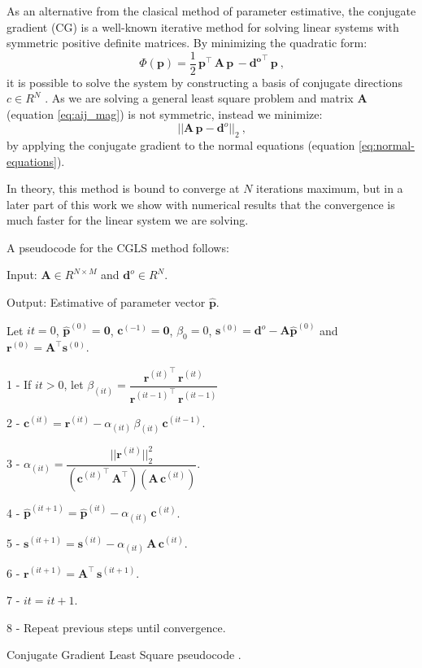 As an alternative from the clasical method of parameter estimative, the conjugate gradient (CG) is a well-known iterative method for solving linear systems with symmetric positive definite matrices. By minimizing the quadratic form:
\begin{equation}
\, \Phi(\mathbf{p}) = \frac{1}{2} \, \mathbf{p}^{\top} \, \mathbf{A} \, \mathbf{p} \,
- \mathbf{{d}^{o}}^{\top} \, \mathbf{p}\: ,
\label{eq:estimated-p-cg}
\end{equation}
it is possible to solve the system by constructing a basis of conjugate directions $c \in R^N$ \citep{aster2018parameter}. As we are solving a general least square problem and matrix $\mathbf{A}$ (equation \ref{eq:aij_mag}) is not symmetric, instead we minimize:
\begin{equation}
\, || \mathbf{A} \, \mathbf{p} - \mathbf{d}^o||_2 \: ,
\label{eq:estimated-p-cgls}
\end{equation}
by applying the conjugate gradient to the normal equations (equation \ref{eq:normal-equations}).

In theory, this method is bound to converge at $N$ iterations maximum, but in a later part of this work we show with numerical results that the convergence is much faster for the linear system we are solving.

A pseudocode for the CGLS method follows:

\begin{algorithm}[H]
	Input: $\mathbf{A} \in R^{N \times M} $ and $\mathbf{d}^o \in R^N$.
	
	Output: Estimative of parameter vector $\hat{\mathbf{p}}$.
	
	Let $it = 0$, $\hat{\mathbf{p}}^{(0)} = {\mathbf{0}}$, $\mathbf{c}^{(-1)} = {\mathbf{0}}$, $\beta_0 = 0$, $\mathbf{s}^{(0)} = \mathbf{d}^{o} - \mathbf{A} \hat{\mathbf{p}}^{(0)}$ and $\mathbf{r}^{(0)} = \mathbf{A}^{\top} \mathbf{s}^{(0)}$.
	
	1 - If $it > 0$, let $\beta_{(it)} = \dfrac{{\mathbf{r}^{(it)}}^{\top} \, \mathbf{r}^{(it)}} {{\mathbf{r}^{(it - 1)}}^{\top} \, \mathbf{r}^{(it - 1)}}$
	
	2 - $\mathbf{c}^{(it)} = \mathbf{r}^{(it)} - \alpha_{(it)} \,\beta_{(it)} \, \mathbf{c}^{(it - 1)}$.
	
	3 - $\alpha_{(it)} = \dfrac{{||\mathbf{r}^{(it)}||^2_2}}{({\mathbf{c}^{(it)}}^{\top} \, \mathbf{A}^{\top})(\mathbf{A} \, \mathbf{c}^{(it)})}$.
	
	4 - $\hat{\mathbf{p}}^{(it + 1)} = \hat{\mathbf{p}}^{(it)} - \alpha_{(it)} \, \mathbf{c}^{(it)}$.
	
	5 - $\mathbf{s}^{(it + 1)} = \mathbf{s}^{(it)} - \alpha_{(it)} \, \mathbf{A} \, \mathbf{c}^{(it)}$.
	
	6 - $\mathbf{r}^{(it + 1)} = \mathbf{A}^{\top} \, \mathbf{s}^{(it + 1)}$.
	
	7 - $it = it + 1$.
	
	8 - Repeat previous steps until convergence.
	
	\caption{Conjugate Gradient Least Square pseudocode \citep[][ p. 166]{aster2018parameter}.}
\label{al:cgls-algorithm}
\end{algorithm}

